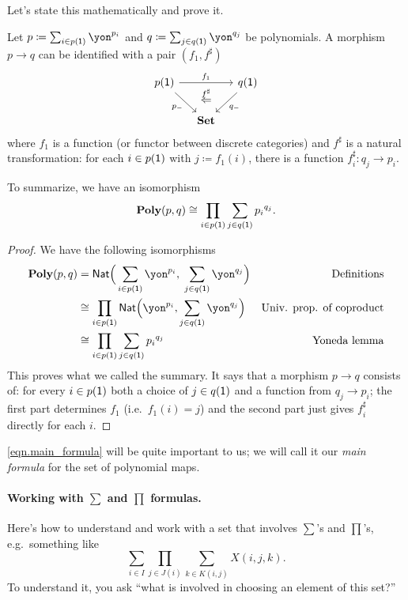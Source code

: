 \documentclass[DynamicalBook]{subfiles}
\begin{document}
Let's state this mathematically and prove it.

\begin{proposition}\label{prop.poly_maps_colax_prod_sum}
Let $p\coloneqq\sum_{i\in p(\1)}\yon^{p_i}$ and $q\coloneqq\sum_{j\in q(\1)}\yon^{q_j}$ be polynomials. A morphism $p\to q$ can be identified with a pair $(f_1,f^\sharp)$
\begin{equation}\label{eqn.colax_poly_map}
\begin{tikzcd}[column sep=small]
	p(\1)\ar[dr, "p_-"']\ar[rr, "f_1"]&~&
	q(\1)\ar[dl, "q_-"]\\&
	\smset\ar[u, phantom, near end, "\overset{f^\sharp}{\Leftarrow}"]
\end{tikzcd}
\end{equation}
where $f_1$ is a function (or functor between discrete categories) and $f^\sharp$ is a natural transformation: for each $i\in p(\textsf{1})$ with $j\coloneqq f_1(i)$, there is a function $f^\sharp_i\colon q_j\to p_i$.

To summarize, we have an isomorphism
\begin{equation}\label{eqn.main_formula}
\textbf{Poly}(p,q)\cong\prod_{i\in p(\textsf{1})}\sum_{j\in q(\textsf{1})}{p_i}^{q_j}.
\end{equation}
\end{proposition}
\begin{proof}
We have the following isomorphisms
\begin{align*}
  \poly(p,q)&=
  \nat\Big(\sum_{i\in p(\1)}\yon^{p_i},\;\sum_{j\in q(\1)}\yon^{q_j}\Big)&
  	\text{Definitions}\\&\cong
  \prod_{i\in p(\1)}\nat\Big(\yon^{p_i},\sum_{j\in q(\1)}\yon^{q_j}\Big)&
  	\text{Univ. prop. of coproduct}\\&\cong
  \prod_{i\in p(\1)}\sum_{j\in q(\1)}{p_i}^{q_j}&
  	\text{Yoneda lemma}
\end{align*}
This proves what we called the summary. It says that a morphism $p\to q$ consists of: for every $i\in p(\textsf{1})$ both a choice of $j\in q(\textsf{1})$ and a function from $q_j\to p_i$; the first part determines $f_1$ (i.e.\ $f_1(i)=j$) and the second part just gives $f^\sharp_i$ directly for each $i$.
\end{proof}

\eqref{eqn.main_formula} will be quite important to us; we will call it our \emph{main formula} for the set of polynomial maps.

\paragraph{Working with $\sum$ and $\prod$ formulas.}
Here's how to understand and work with a set that involves $\sum$'s and $\prod$'s, e.g.\ something like
\begin{equation}\label{eqn.misc98339}
\sum_{i\in I}\prod_{j\in J(i)}\sum_{k\in K(i,j)}X(i,j,k).
\end{equation}
To understand it, you ask ``what is involved in choosing an element of this set?'' 
\end{document}
